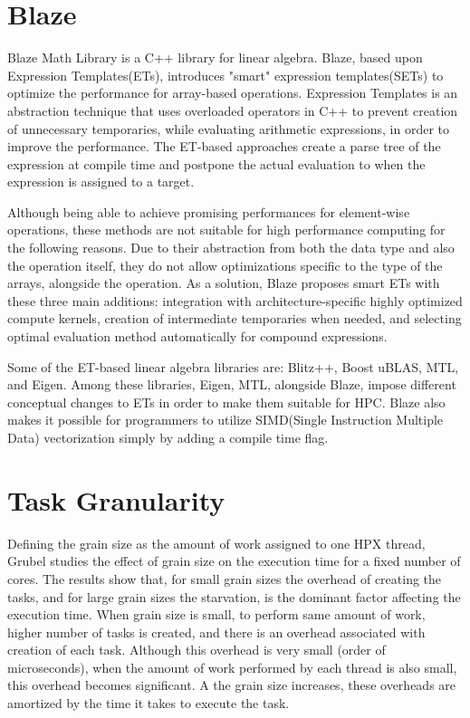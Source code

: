 \vspace{\baselineskip}
\section{Blaze}
Blaze Math Library\cite{iglberger2012expression} is a C++ library for linear algebra. Blaze, based upon Expression Templates(ETs)\cite{veldhuizen1995expression}, introduces "smart" expression templates(SETs)\cite{iglberger2012expression} to optimize the performance for array-based operations. Expression Templates\cite{veldhuizen1995expression} is an abstraction technique that uses overloaded operators in C++ to prevent creation of unnecessary temporaries, while evaluating arithmetic expressions, in order to improve the performance\cite{iglberger2012expression}. The ET-based approaches create a parse tree of the expression at compile time and postpone the actual evaluation to when the expression is assigned to a target. 

Although being able to achieve promising performances for element-wise operations, these methods are not suitable for high performance computing for the following reasons. Due to their abstraction from both the data type and also the operation itself, they do not allow optimizations specific to the type of the arrays, alongside the operation\cite{iglberger2012expression}. As a solution, Blaze proposes smart ETs with these three main additions: integration with architecture-specific highly optimized compute kernels, creation of intermediate temporaries when needed, and selecting optimal evaluation method automatically for compound expressions\cite{iglberger2012expression}. 

Some of the ET-based linear algebra libraries are: Blitz++\cite{Blitz}, Boost uBLAS\cite{ublas}, MTL\cite{MTL}, and Eigen\cite{guennebaud2010eigen}. Among these libraries, Eigen, MTL, alongside Blaze, impose different conceptual changes to ETs in order to make them suitable for HPC.    
Blaze also makes it possible for programmers to utilize SIMD(Single Instruction Multiple Data) vectorization simply by adding a compile time flag.

\vspace{\baselineskip}
\section{Task Granularity}
Defining the grain size as the amount of work assigned to one HPX thread, Grubel\cite{grubel2015performance} studies the effect of grain size on the execution time for a fixed number of cores. The results show that, for small grain sizes the overhead of creating the tasks, and for large grain sizes the starvation, is the dominant factor affecting the execution time\cite{grubel2015performance}. When grain size is small, to perform same amount of work, higher number of tasks is created, and there is an overhead associated with creation of each task. Although this overhead is very small (order of microseconds), when the amount of work performed by each thread is also small, this overhead becomes significant. A the grain size increases, these overheads are amortized by the time it takes to execute the task. 

